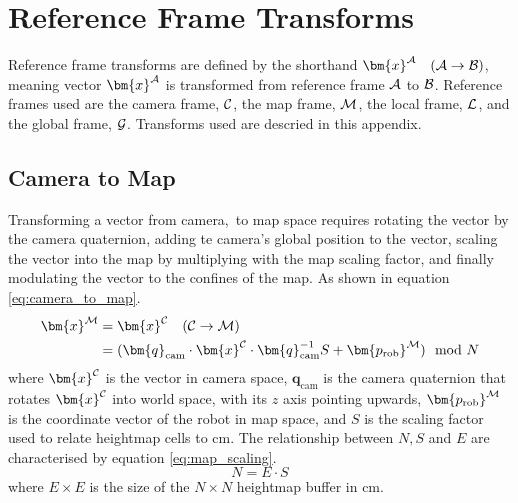 \chapter{Reference Frame Transforms} \label{app:transforms}
    Reference frame transforms are defined by the shorthand \(\bm{x}\inrefframe{A}\transframe{A}{B}\), meaning vector \(\bm{x}\inrefframe{A}\) is transformed
    from reference frame \(\mathcal{A}\) to \(\mathcal{B}\). Reference frames used are the camera frame, \(\mathcal{C}\),
    the map frame, \(\mathcal{M}\), the local frame, \(\mathcal{L}\), and the global frame, \(\mathcal{G}\). Transforms used are
    descried in this appendix.

    \section{Camera to Map}
        Transforming a vector from camera,\ to map space requires rotating the vector by the camera quaternion, adding
        te camera's global position to the vector, scaling the vector into the map by multiplying with the map scaling
        factor, and finally modulating the vector to the confines of the map. As shown in equation \ref{eq:camera_to_map}.
        \begin{align} \label{eq:camera_to_map}
        \begin{split}
            \bm{x}\inrefframe{M} &= \bm{x}\inrefframe{C}\transframe{C}{M}\\ 
            &= (\bm{q}_\text{cam} \cdot \bm{x}\inrefframe{C} \cdot \bm{q}_\text{cam}^{-1}S + \bm{p_\text{rob}}\inrefframe{M}) \mod N
        \end{split}
        \end{align}
        where \(\bm{x}\inrefframe{C}\) is the vector in camera space, \(\bm{q}_\text{cam}\) is the camera quaternion that rotates \(\bm{x}\inrefframe{C}\) 
        into world space, with its \(z\) axis pointing upwards, \(\bm{p_\text{rob}}\inrefframe{M}\) is the coordinate vector of the robot in map space, and \(S\) is the scaling factor
        used to relate heightmap cells to cm. The relationship between \(N, S\) and \(E\) are characterised by equation \ref{eq:map_scaling}.
        \begin{equation} \label{eq:map_scaling}
            N = E \cdot S
        \end{equation}
        where \(E\times E\) is the size of the \(N\times N\) heightmap buffer in cm.
    
    \newpage
